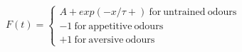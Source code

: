  $F(t) =  \begin{cases} A+exp(−x/τ+)\:\mathrm{for\:untrained\:odours}\\-1\:\mathrm{for\:appetitive\:odours}\\+1\:\mathrm{for\:aversive\:odours} \end{cases}$
 